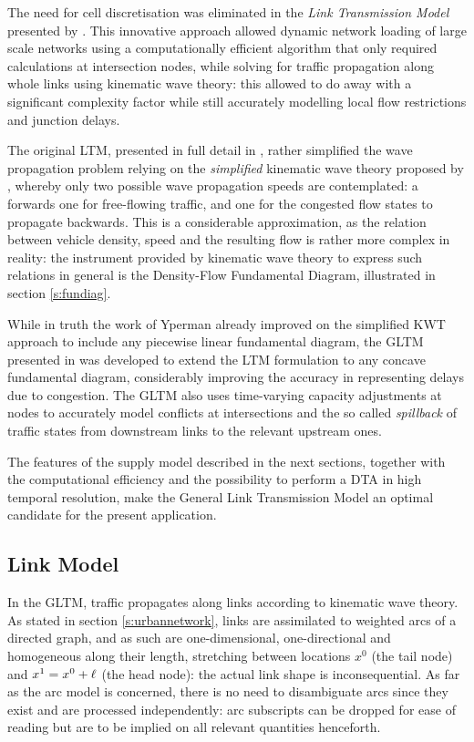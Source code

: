 The need for cell discretisation was eliminated in the \emph{Link Transmission Model} presented by \cite{yperman2005link}. This innovative approach allowed dynamic network loading of large scale networks using a computationally efficient algorithm that only required calculations at intersection nodes, while solving for traffic propagation along whole links using kinematic wave theory: this allowed to do away with a significant complexity factor while still accurately modelling local flow restrictions and junction delays.

The original LTM, presented in full detail in \cite{yperman2007link}, rather simplified the wave propagation problem relying on the \emph{simplified} kinematic wave theory proposed by \citep{newell1993simplified}, whereby only two possible wave propagation speeds are contemplated: a forwards one for free-flowing traffic, and one for the congested flow states to propagate backwards.
This is a considerable approximation, as the relation between vehicle density, speed and the resulting flow is rather more complex in reality:
the instrument provided by kinematic wave theory to express such relations in general is the Density-Flow Fundamental Diagram, illustrated in section \ref{s:fundiag}.

While in truth the work of Yperman already improved on the simplified KWT approach to include any piecewise linear fundamental diagram, the GLTM presented in \cite{gentile2010general} was developed to extend the LTM formulation to any concave fundamental diagram, considerably improving the accuracy in representing delays due to congestion. The GLTM also uses time-varying capacity adjustments at nodes to accurately model conflicts at intersections and the so called \emph{spillback} of traffic states from downstream links to the relevant upstream ones.

The features of the supply model described in the next sections, together with the computational efficiency and the possibility to perform a DTA in high temporal resolution, make the General Link Transmission Model an optimal candidate for the present application.


\subsection{Link Model} \label{s:linkmodel}
In the GLTM, traffic propagates along links according to kinematic wave theory.
As stated in section \ref{s:urbannetwork}, links are assimilated to weighted arcs of a directed graph, and as such are one-dimensional, one-directional and homogeneous along their length, stretching between locations $x^0$ (the tail node) and $x^1 = x^0 + \ell$ (the head node): the actual link shape is inconsequential. As far as the arc model is concerned, there is no need to disambiguate arcs since they exist and are processed independently: arc subscripts can be dropped for ease of reading but are to be implied on all relevant quantities henceforth.


